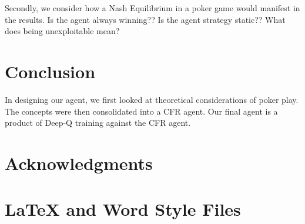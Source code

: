 \documentclass{article}
\begin{document}
Secondly, we consider how a Nash Equilibrium in a poker game would manifest in the results. Is the agent always winning?? Is the agent strategy static?? What does being unexploitable mean?

\section{Conclusion}

In designing our agent, we first looked at theoretical considerations of poker play. The concepts were then consolidated into a CFR agent. Our final agent is a product of Deep-Q training against the CFR agent.

\section{Acknowledgments}

\appendix

\section{\LaTeX{} and Word Style Files}\label{stylefiles}



\end{document}
